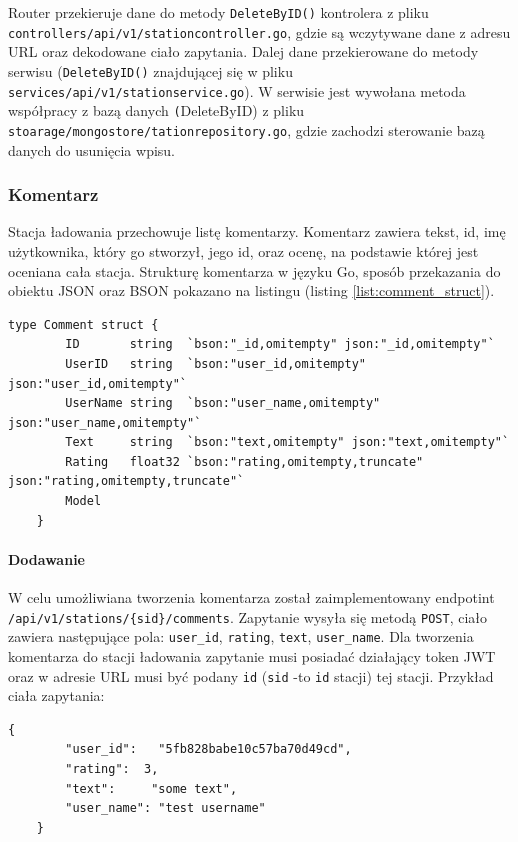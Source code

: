 Router przekieruje dane do metody \texttt{DeleteByID()} kontrolera z pliku \texttt{controllers/api/v1/stationcontroller.go}, gdzie są wczytywane dane z adresu URL oraz dekodowane ciało zapytania. Dalej dane przekierowane do metody serwisu (\texttt{DeleteByID()} znajdującej się w pliku \texttt{services/api/v1/stationservice.go}).
W serwisie jest wywołana metoda współpracy z bazą danych \texttt(DeleteByID) z pliku \texttt{stoarage/mongostore/tationrepository.go}, gdzie zachodzi sterowanie bazą danych do usunięcia wpisu.
\subsubsection{Komentarz}
Stacja ładowania przechowuje listę komentarzy. Komentarz zawiera tekst, id, imę użytkownika, który go stworzył, jego id, oraz ocenę, na podstawie której jest oceniana cała stacja.
Strukturę komentarza w języku Go, sposób przekazania do obiektu JSON oraz BSON pokazano na listingu (listing \ref{list:comment_struct}).
\begin{lstlisting}[label=list:comment_struct,caption=Model danych komentarza.,basicstyle=\tiny\ttfamily]
    type Comment struct {
        ID       string  `bson:"_id,omitempty" json:"_id,omitempty"`
        UserID   string  `bson:"user_id,omitempty" json:"user_id,omitempty"`
        UserName string  `bson:"user_name,omitempty" json:"user_name,omitempty"`
        Text     string  `bson:"text,omitempty" json:"text,omitempty"`
        Rating   float32 `bson:"rating,omitempty,truncate" json:"rating,omitempty,truncate"`
        Model
    }
\end{lstlisting}

\paragraph{Dodawanie\newline}
W celu umożliwiana tworzenia komentarza został zaimplementowany endpotint \texttt{/api/v1/stations/\{sid\}/comments}.
Zapytanie wysyła się metodą \texttt{POST}, ciało zawiera następujące pola: \texttt{user\_id}, \texttt{rating}, \texttt{text}, \texttt{user\_name}.
Dla tworzenia komentarza do stacji ładowania zapytanie musi posiadać działający token JWT oraz w adresie URL musi być podany \texttt{id} (\texttt{sid} -to \texttt{id} stacji) tej stacji.
Przykład ciała zapytania:
\begin{lstlisting}[basicstyle=\tiny\ttfamily]
    {
		"user_id":   "5fb828babe10c57ba70d49cd",
		"rating":  3,
		"text":     "some text",
		"user_name": "test username"
    }
\end{lstlisting}

